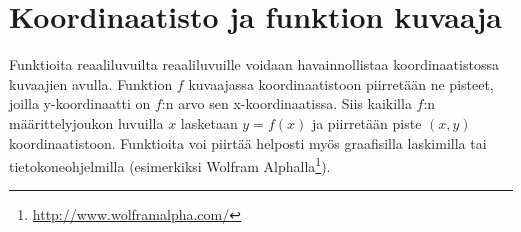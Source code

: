 \section{Koordinaatisto ja funktion kuvaaja}
Funktioita reaaliluvuilta reaaliluvuille voidaan havainnollistaa koordinaatistossa kuvaajien avulla. Funktion $f$ kuvaajassa koordinaatistoon piirretään ne pisteet, joilla y-koordinaatti on $f$:n arvo sen x-koordinaatissa. Siis kaikilla $f$:n määrittelyjoukon luvuilla $x$ lasketaan $y = f(x)$ ja piirretään piste $(x, y)$ koordinaatistoon. Funktioita voi piirtää helposti myös graafisilla laskimilla tai tietokoneohjelmilla (esimerkiksi Wolfram Alphalla\footnote{\url{http://www.wolframalpha.com/}}).

\def\vcent#1{\mathsurround0pt$\vcenter{\hbox{#1}}$}



